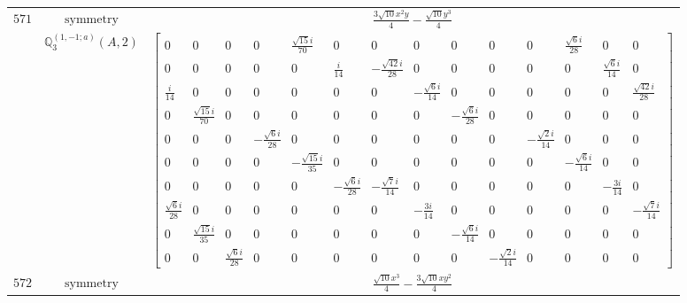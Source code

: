 \documentclass[fleqn,8pt,landscape]{jsarticle}
\begin{document}
\begin{longtable}{ccc}
$ 571 $ & $ \text{symmetry} $ & $ \frac{3 \sqrt{10} x^{2} y}{4} - \frac{\sqrt{10} y^{3}}{4} $ \\
$  $ & $ \mathbb{Q}_{3}^{(1,-1;a)}(A,2) $ & $ \begin{bmatrix} 0 & 0 & 0 & 0 & \frac{\sqrt{15} i}{70} & 0 & 0 & 0 & 0 & 0 & 0 & \frac{\sqrt{6} i}{28} & 0 & 0 \\ 0 & 0 & 0 & 0 & 0 & \frac{i}{14} & - \frac{\sqrt{42} i}{28} & 0 & 0 & 0 & 0 & 0 & \frac{\sqrt{6} i}{14} & 0 \\ \frac{i}{14} & 0 & 0 & 0 & 0 & 0 & 0 & - \frac{\sqrt{6} i}{14} & 0 & 0 & 0 & 0 & 0 & \frac{\sqrt{42} i}{28} \\ 0 & \frac{\sqrt{15} i}{70} & 0 & 0 & 0 & 0 & 0 & 0 & - \frac{\sqrt{6} i}{28} & 0 & 0 & 0 & 0 & 0 \\ 0 & 0 & 0 & - \frac{\sqrt{6} i}{28} & 0 & 0 & 0 & 0 & 0 & 0 & - \frac{\sqrt{2} i}{14} & 0 & 0 & 0 \\ 0 & 0 & 0 & 0 & - \frac{\sqrt{15} i}{35} & 0 & 0 & 0 & 0 & 0 & 0 & - \frac{\sqrt{6} i}{14} & 0 & 0 \\ 0 & 0 & 0 & 0 & 0 & - \frac{\sqrt{6} i}{28} & - \frac{\sqrt{7} i}{14} & 0 & 0 & 0 & 0 & 0 & - \frac{3 i}{14} & 0 \\ \frac{\sqrt{6} i}{28} & 0 & 0 & 0 & 0 & 0 & 0 & - \frac{3 i}{14} & 0 & 0 & 0 & 0 & 0 & - \frac{\sqrt{7} i}{14} \\ 0 & \frac{\sqrt{15} i}{35} & 0 & 0 & 0 & 0 & 0 & 0 & - \frac{\sqrt{6} i}{14} & 0 & 0 & 0 & 0 & 0 \\ 0 & 0 & \frac{\sqrt{6} i}{28} & 0 & 0 & 0 & 0 & 0 & 0 & - \frac{\sqrt{2} i}{14} & 0 & 0 & 0 & 0 \end{bmatrix} $ \\ \hline
$ 572 $ & $ \text{symmetry} $ & $ \frac{\sqrt{10} x^{3}}{4} - \frac{3 \sqrt{10} x y^{2}}{4} $ \\

\end{longtable}
\end{document}
